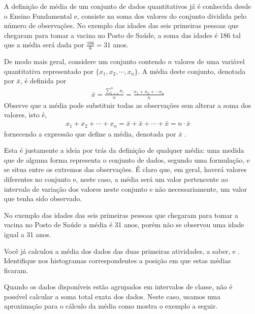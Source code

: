 A definição de média de um conjunto de dados quantitativos já é conhecida desde o Ensino Fundamental e, consiste na soma dos valores do conjunto dividida pelo número de observações. No exemplo das idades das seis primeiras pessoas que chegaram para tomar a vacina no Posto de Saúde, a soma das idades é 186 tal que a média será dada por \(\frac{186}{6}=31\) anos.

De modo mais geral, considere um conjunto contendo \(n\) valores de uma variável quantitativa representado por \(\{x_1,x_2,\cdots,x_n\}\).
A média deste conjunto, denotada por \(\bar{x}\),  é definida por
\begin{equation*}
\begin{split}\bar{x}=\frac{\sum^n_{i=1}x_i}{n}=\frac{x_1+x_2+\cdots x_n}{n}\end{split}
\end{equation*}
Observe que a média pode substituir todas as observações sem alterar a  soma dos valores, isto é,
\begin{equation*}
\begin{split}x_1+x_2+\cdots+x_n=\bar{x}+\bar{x}+\cdots+\bar{x} = n\cdot \bar{x}\end{split}
\end{equation*}
fornecendo a expressão que define a média, denotada por \(\bar{x}\) .

Esta é justamente a ideia por trás da definição de qualquer média: uma medida que de alguma forma representa o conjunto de dados, segundo uma formulação, e se situa entre os extremos das observações. É claro que, em geral, haverá valores diferentes no conjunto e, neste caso, a média será um valor pertencente ao intervalo de variação dos valores neste conjunto e não necessariamente, um valor que tenha sido observado.

No exemplo das idades das seis primeiras pessoas que chegaram para tomar a vacina no Posto de Saúde a média é 31 anos, porém não se observou uma idade igual a 31 anos.

Você já calculou a média dos dados das duas primeiras atividades, a saber,  e . Identifique nos histogramas correspondentes a posição em que estas médias ficaram.


Quando os dados disponíveis estão agrupados em intervalos de classe,  não é possível calcular a soma total exata dos dados. Neste caso, usamos uma aproximação para o cálculo da média como mostra o exemplo a seguir.

